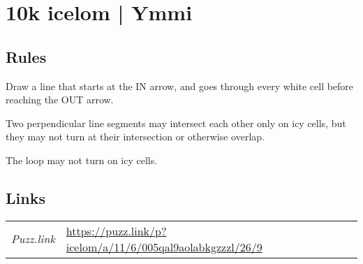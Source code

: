 \section[10k icelom | Ymmi {[\emph{Icelom}]}]{10k icelom | {\normalfont Ymmi}}
\label{sec:08-10k-icelom-ymmi}

\subsection*{Rules}
\begin{markdown}
Draw a line that starts at the IN arrow, and goes through every white cell before reaching the OUT arrow.

Two perpendicular line segments may intersect each other only on icy cells, but they may not turn at their intersection or otherwise overlap.

The loop may not turn on icy cells.
\end{markdown}
\subsection*{Links}
\begin{tabularx}{\textwidth}{l X}
\emph{Puzz.link} & \url{https://puzz.link/p?icelom/a/11/6/005qal9aolabkgzzzl/26/9} \\
\end{tabularx}
\pagebreak
